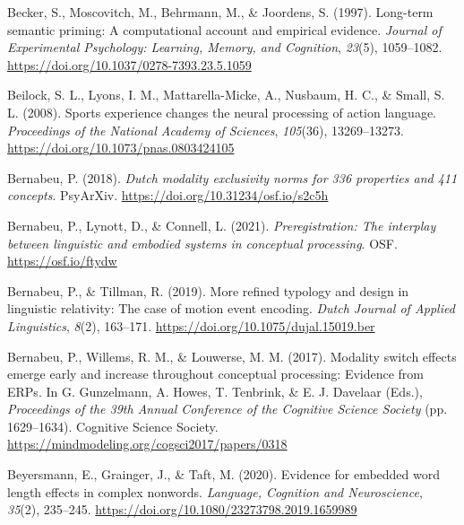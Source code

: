 \documentclass[
  12pt,
  man,floatsintext]{apa7}
\newlength{\cslhangindent}
\newlength{\cslentryspacingunit} %
\newenvironment{CSLReferences}[2] %
 {%
  \setlength{\parindent}{0pt}
  \ifodd #1
  \let\oldpar\par
  \def\par{\hangindent=\cslhangindent\oldpar}
  \fi
  \setlength{\parskip}{#2\cslentryspacingunit}
 }%
 {}
\begin{document}
\begin{CSLReferences}{1}{0}
\leavevmode{}%
Becker, S., Moscovitch, M., Behrmann, M., \& Joordens, S. (1997). Long-term semantic priming: {A} computational account and empirical evidence. \emph{Journal of Experimental Psychology: Learning, Memory, and Cognition}, \emph{23}(5), 1059--1082. \url{https://doi.org/10.1037/0278-7393.23.5.1059}

\leavevmode{}%
Beilock, S. L., Lyons, I. M., Mattarella-Micke, A., Nusbaum, H. C., \& Small, S. L. (2008). Sports experience changes the neural processing of action language. \emph{Proceedings of the National Academy of Sciences}, \emph{105}(36), 13269--13273. \url{https://doi.org/10.1073/pnas.0803424105}

\leavevmode{}%
Bernabeu, P. (2018). \emph{Dutch modality exclusivity norms for 336 properties and 411 concepts}. {PsyArXiv}. \url{https://doi.org/10.31234/osf.io/s2c5h}

\leavevmode{}%
Bernabeu, P., Lynott, D., \& Connell, L. (2021). \emph{Preregistration: {The} interplay between linguistic and embodied systems in conceptual processing}. {OSF}. \url{https://osf.io/ftydw}

\leavevmode{}%
Bernabeu, P., \& Tillman, R. (2019). More refined typology and design in linguistic relativity: {The} case of motion event encoding. \emph{Dutch Journal of Applied Linguistics}, \emph{8}(2), 163--171. \url{https://doi.org/10.1075/dujal.15019.ber}

\leavevmode{}%
Bernabeu, P., Willems, R. M., \& Louwerse, M. M. (2017). Modality switch effects emerge early and increase throughout conceptual processing: {Evidence} from {ERPs}. In G. Gunzelmann, A. Howes, T. Tenbrink, \& E. J. Davelaar (Eds.), \emph{Proceedings of the 39th {Annual Conference} of the {Cognitive Science Society}} (pp. 1629--1634). {Cognitive Science Society}. \url{https://mindmodeling.org/cogsci2017/papers/0318}

\leavevmode{}%
Beyersmann, E., Grainger, J., \& Taft, M. (2020). Evidence for embedded word length effects in complex nonwords. \emph{Language, Cognition and Neuroscience}, \emph{35}(2), 235--245. \url{https://doi.org/10.1080/23273798.2019.1659989}


\end{CSLReferences}
\end{document}
